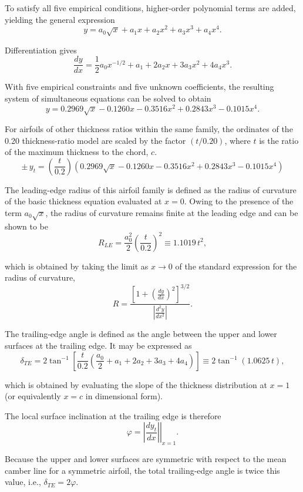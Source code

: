 To satisfy all five empirical conditions, higher-order polynomial terms are added, 
yielding the general expression
\[
y = a_0 \sqrt{x}
    + a_1 x
    + a_2 x^2
    + a_3 x^3
    + a_4 x^4 .
\]

Differentiation gives
\[
\frac{dy}{dx}
=
\frac{1}{2} a_0 x^{-1/2}
+ a_1
+ 2 a_2 x
+ 3 a_3 x^2
+ 4 a_4 x^3 .
\]

With five empirical constraints and five unknown coefficients, the resulting 
system of simultaneous equations can be solved to obtain
\[
y =
0.2969 \sqrt{x}
- 0.1260 x
- 0.3516 x^2
+ 0.2843 x^3
- 0.1015 x^4 .
\]

For airfoils of other thickness ratios within the same family, the ordinates of 
the 0.20 thickness-ratio model are scaled by the factor $(t/0.20)$, where $t$ is the ratio of the maximum thickness to the chord, $c$.
\[
\pm\, y_{t} =
\left(\frac{t}{0.2}\right)
\left(
0.2969 \sqrt{x}
- 0.1260 x
- 0.3516 x^2
+ 0.2843 x^3
- 0.1015 x^4 
\right)
\]

The leading-edge radius of this airfoil family is defined as the radius of 
curvature of the basic thickness equation evaluated at $x = 0$. 
Owing to the presence of the term $a_0 \sqrt{x}$, the radius of curvature 
remains finite at the leading edge and can be shown to be
\begin{equation}
R_{LE} = \frac{a_0^2}{2}
\left(\frac{t}{0.2}\right)^2
\equiv 1.1019\, t^2 ,
\end{equation}

which is obtained by taking the limit as $x \to 0$ of the standard expression 
for the radius of curvature,
\[
R = 
\frac{
\left[
1+\left(\displaystyle\frac{dy}{dx}\right)^2
\right]^{3/2}
}{
\left|
\displaystyle \frac{d^2y}{dx^2}
\right|
}.
\]

The trailing-edge angle is defined as the angle between the upper and lower 
surfaces at the trailing edge. It may be expressed as
\begin{equation}
\delta_{TE}
=
2 \tan^{-1}
\left[
\frac{t}{0.2}
\left(
\frac{a_0}{2}
+ a_1
+ 2a_2
+ 3a_3
+ 4a_4
\right)
\right]
\equiv
2 \tan^{-1}(1.0625\, t),
\end{equation}

which is obtained by evaluating the slope of the thickness distribution 
at $x = 1$ (or equivalently $x = c$ in dimensional form).

The local surface inclination at the trailing edge is therefore
\[
\varphi =
\left.
\left|
\frac{dy_t}{dx}
\right|
\right|_{x=1}.
\]

Because the upper and lower surfaces are symmetric with respect to the mean 
camber line for a symmetric airfoil, 
the total trailing-edge angle is 
twice this value, i.e., $\delta_{TE} = 2\varphi$.

